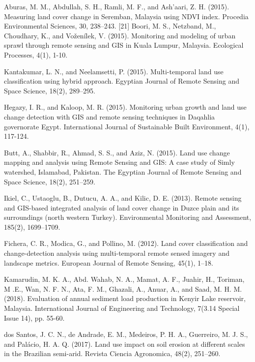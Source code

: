  Aburas, M. M., Abdullah, S. H., Ramli, M. F., and Ash’aari, Z. H.
(2015). Measuring land cover change in Seremban, Malaysia using
NDVI index. Procedia Environmental Sciences, 30, 238–243.
[21] Boori, M. S., Netzband, M., Choudhary, K., and Voženílek, V.
(2015). Monitoring and modeling of urban sprawl through remote
sensing and GIS in Kuala Lumpur, Malaysia. Ecological Processes,
4(1), 1-10.

Kantakumar, L. N., and Neelamsetti, P. (2015). Multi-temporal land
use classification using hybrid approach. Egyptian Journal of
Remote Sensing and Space Science, 18(2), 289–295.

 Hegazy, I. R., and Kaloop, M. R. (2015). Monitoring urban growth
and land use change detection with GIS and remote sensing
techniques in Daqahlia governorate Egypt. International Journal of
Sustainable Built Environment, 4(1), 117-124.

 Butt, A., Shabbir, R., Ahmad, S. S., and Aziz, N. (2015). Land use
change mapping and analysis using Remote Sensing and GIS: A
case study of Simly watershed, Islamabad, Pakistan. The Egyptian
Journal of Remote Sensing and Space Science, 18(2), 251–259.


 Ikiel, C., Ustaoglu, B., Dutucu, A. A., and Kilic, D. E. (2013).
Remote sensing and GIS-based integrated analysis of land cover
change in Duzce plain and its surroundings (north western Turkey).
Environmental Monitoring and Assessment, 185(2), 1699–1709.

 Fichera, C. R., Modica, G., and Pollino, M. (2012). Land cover
classification and change-detection analysis using multi-temporal
remote sensed imagery and landscape metrics. European Journal of
Remote Sensing, 45(1), 1–18.


 Kamarudin, M. K. A., Abd. Wahab, N. A., Mamat, A. F., Juahir, H.,
Toriman, M .E., Wan, N. F. N., Ata, F. M., Ghazali, A., Anuar, A.,
and Saad, M. H. M. (2018). Evaluation of annual sediment load
production in Kenyir Lake reservoir, Malaysia. International
Journal of Engineering and Technology, 7(3.14 Special Issue 14),
pp. 55-60.


 dos Santos, J. C. N., de Andrade, E. M., Medeiros, P. H. A.,
Guerreiro, M. J. S., and Palácio, H. A. Q. (2017). Land use impact on
soil erosion at different scales in the Brazilian semi-arid. Revista
Ciencia Agronomica, 48(2), 251–260.